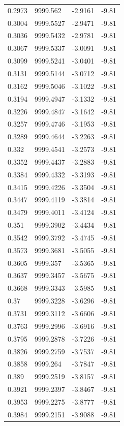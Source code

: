 \begin{table}[H]
\begin{tabular}{llll}
0.2973 & 9999.562 & -2.9161 & -9.81 \\
0.3004 & 9999.5527 & -2.9471 & -9.81 \\
0.3036 & 9999.5432 & -2.9781 & -9.81 \\
0.3067 & 9999.5337 & -3.0091 & -9.81 \\
0.3099 & 9999.5241 & -3.0401 & -9.81 \\
0.3131 & 9999.5144 & -3.0712 & -9.81 \\
0.3162 & 9999.5046 & -3.1022 & -9.81 \\
0.3194 & 9999.4947 & -3.1332 & -9.81 \\
0.3226 & 9999.4847 & -3.1642 & -9.81 \\
0.3257 & 9999.4746 & -3.1953 & -9.81 \\
0.3289 & 9999.4644 & -3.2263 & -9.81 \\
0.332 & 9999.4541 & -3.2573 & -9.81 \\
0.3352 & 9999.4437 & -3.2883 & -9.81 \\
0.3384 & 9999.4332 & -3.3193 & -9.81 \\
0.3415 & 9999.4226 & -3.3504 & -9.81 \\
0.3447 & 9999.4119 & -3.3814 & -9.81 \\
0.3479 & 9999.4011 & -3.4124 & -9.81 \\
0.351 & 9999.3902 & -3.4434 & -9.81 \\
0.3542 & 9999.3792 & -3.4745 & -9.81 \\
0.3573 & 9999.3681 & -3.5055 & -9.81 \\
0.3605 & 9999.357 & -3.5365 & -9.81 \\
0.3637 & 9999.3457 & -3.5675 & -9.81 \\
0.3668 & 9999.3343 & -3.5985 & -9.81 \\
0.37 & 9999.3228 & -3.6296 & -9.81 \\
0.3731 & 9999.3112 & -3.6606 & -9.81 \\
0.3763 & 9999.2996 & -3.6916 & -9.81 \\
0.3795 & 9999.2878 & -3.7226 & -9.81 \\
0.3826 & 9999.2759 & -3.7537 & -9.81 \\
0.3858 & 9999.264 & -3.7847 & -9.81 \\
0.389 & 9999.2519 & -3.8157 & -9.81 \\
0.3921 & 9999.2397 & -3.8467 & -9.81 \\
0.3953 & 9999.2275 & -3.8777 & -9.81 \\
0.3984 & 9999.2151 & -3.9088 & -9.81 \\

\end{tabular}
\end{table}
